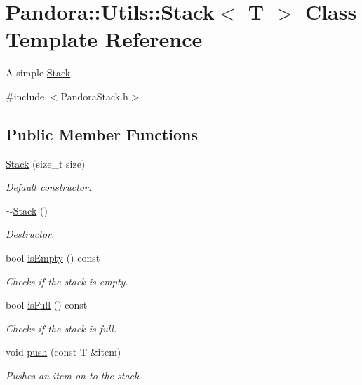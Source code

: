 \hypertarget{classPandora_1_1Utils_1_1Stack}{
\section{Pandora::Utils::Stack$<$ T $>$ Class Template Reference}
\label{classPandora_1_1Utils_1_1Stack}
}


A simple \hyperlink{classPandora_1_1Utils_1_1Stack}{Stack}.  


{\ttfamily \#include $<$PandoraStack.h$>$}\subsection*{Public Member Functions}
\begin{DoxyCompactItemize}
\item 
\hyperlink{classPandora_1_1Utils_1_1Stack_aeebc274daaf6ba9da141e53dcd818352}{Stack} (size\_\-t size)
\begin{DoxyCompactList}\small\item\em Default constructor. \item\end{DoxyCompactList}\item 
\hyperlink{classPandora_1_1Utils_1_1Stack_a57c562706664edfabf43169405d5c247}{$\sim$Stack} ()
\begin{DoxyCompactList}\small\item\em Destructor. \item\end{DoxyCompactList}\item 
bool \hyperlink{classPandora_1_1Utils_1_1Stack_a163441b950b324b28db471e793e20c62}{isEmpty} () const 
\begin{DoxyCompactList}\small\item\em Checks if the stack is empty. \item\end{DoxyCompactList}\item 
bool \hyperlink{classPandora_1_1Utils_1_1Stack_aceefd2e5cbc10a11bcbaa3d73cd78bbc}{isFull} () const 
\begin{DoxyCompactList}\small\item\em Checks if the stack is full. \item\end{DoxyCompactList}\item 
void \hyperlink{classPandora_1_1Utils_1_1Stack_a910af8de7eaaa2200515e7efb8251571}{push} (const T \&item)
\begin{DoxyCompactList}\small\item\em Pushes an item on to the stack. \item\end{DoxyCompactList}\item 

\end{DoxyCompactItemize}
